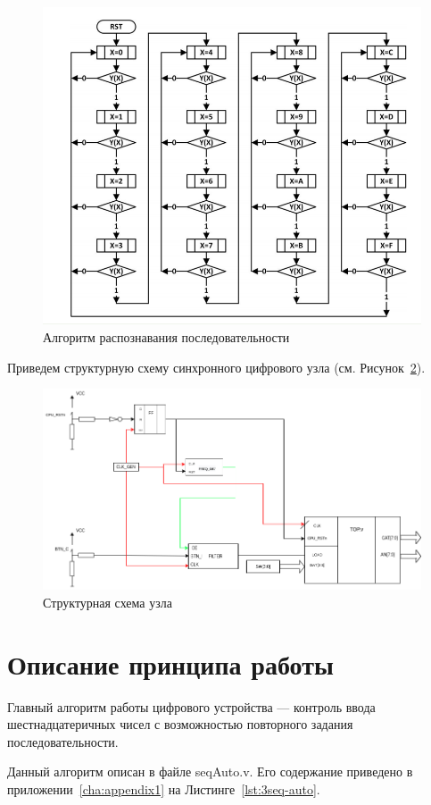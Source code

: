\begin{figure}[h!]
	\centering
	\includegraphics[width=0.68\linewidth]{course-plis/images/lab3/algorithm-pract3}
	\caption{Алгоритм распознавания последовательности}
	\label{fig:algorithm-pract3}
\end{figure}

Приведем структурную схему синхронного цифрового узла (см. Рисунок~\ref{fig:unit-pract3}).

\begin{figure}[h!]
	\centering
	\includegraphics[width=0.8\linewidth]{course-plis/images/lab3/unit-pract3}
	\caption{Структурная схема узла}
	\label{fig:unit-pract3}
\end{figure}


\section{Описание принципа работы}

Главный алгоритм работы цифрового устройства --- контроль ввода шестнадцатеричных чисел с возможностью повторного задания последовательности.

Данный алгоритм описан в файле {seqAuto.v}. Его содержание приведено в приложении~\ref{cha:appendix1} на Листинге~\ref{lst:3seq-auto}.

